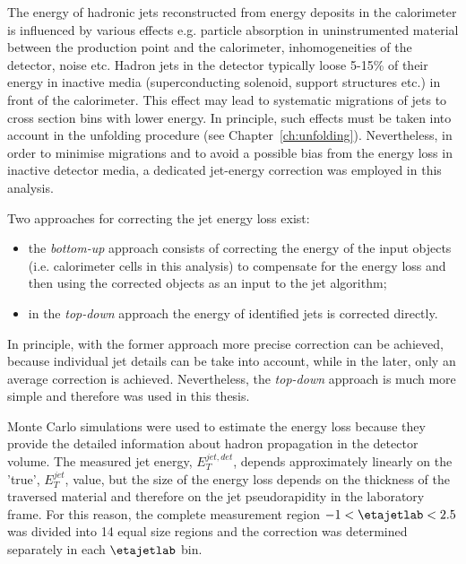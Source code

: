 The energy of hadronic jets reconstructed from energy deposits in the calorimeter is influenced by various effects e.g. particle absorption in uninstrumented material between the production point and the calorimeter, inhomogeneities of the detector, noise etc. Hadron jets in the \zeus detector typically loose 5-15\% of their energy in inactive media (superconducting solenoid, support structures etc.) in front of the calorimeter. This effect may lead to systematic migrations of jets to cross section bins with lower energy. In principle, such effects must be taken into account in the unfolding procedure (see Chapter~\ref{ch:unfolding}). Nevertheless, in order to minimise migrations and to avoid a possible bias from the energy loss in inactive detector media, a dedicated jet-energy correction was employed in this analysis.

Two approaches for correcting the jet energy loss exist:
\begin{itemize}
 \item the \emph{bottom-up} approach consists of correcting the energy of the input objects (i.e. calorimeter cells in this analysis) to compensate for the energy loss and then using the corrected objects as an input to the jet algorithm;
 \item in the \emph{top-down} approach the energy of identified jets is corrected directly.
\end{itemize}
In principle, with the former approach more precise correction can be achieved, because individual jet details can be take into account, while in the later, only an average correction is achieved. Nevertheless, the \emph{top-down} approach is much more simple and therefore was used in this thesis.

Monte Carlo simulations were used to estimate the energy loss because they provide the detailed information about hadron propagation in the detector volume. The measured jet energy, $E_T^{jet,det}$, depends approximately linearly on the 'true', $E_T^{jet}$, value, but the size of the energy loss depends on the thickness of the traversed material and therefore on the jet pseudorapidity in the laboratory frame. For this reason, the complete measurement region $-1<\etajetlab<2.5$ was divided into 14 equal size regions and the correction was determined separately in each $\etajetlab$ bin.


